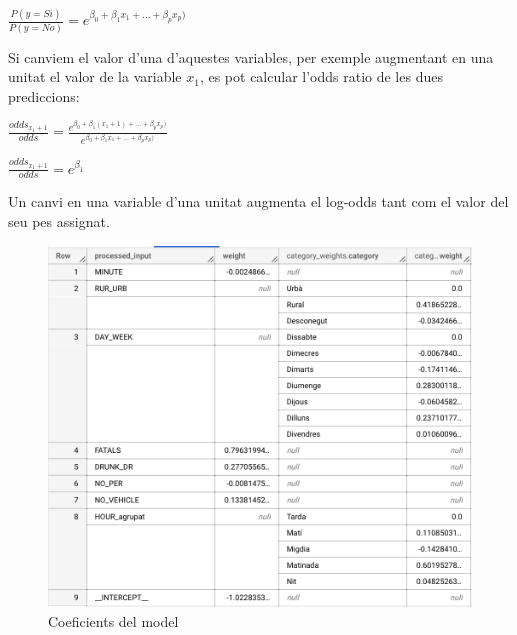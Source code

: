 \documentclass[11pt,longbibliography]{article}
\theoremstyle{definition}
\theoremstyle{remark}
\begin{document}
\begin{center}

$\frac{P(y = Si)}{P(y = No)}  = e^{ \beta_0 + \beta_1 x_1 + ... + \beta_p x_p)}$

\end{center}



Si canviem el valor d'una d'aquestes variables, per exemple augmentant en una unitat el valor de la variable $x_1$, es pot calcular l'odds ratio de les dues prediccions:

\begin{center}

$\frac{odds_{x_1 + 1}}{odds} = \frac{e^{ \beta_0 + \beta_1 (x_1 + 1) + ... + \beta_p x_p)}}{e^{ \beta_0 + \beta_1 x_1 + ... + \beta_p x_p)}}$

\vspace{2mm}

$\frac{odds_{x_1 + 1}}{odds} = e^{\beta_1}$

\end{center}


Un canvi en una variable d'una unitat augmenta el log-odds tant com el valor del seu pes assignat.

\begin{figure}[H]
\begin{center}
\includegraphics[width=15cm]{log3a}
\end{center}
\caption{Coeficients del model}
\label{fig:log3}
\end{figure}
\end{document}
